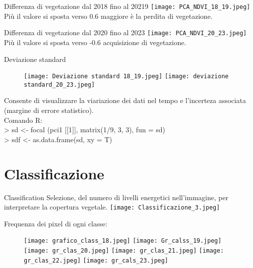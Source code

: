 \documentclass[10pt]{beamer}
\begin{document}
\begin{frame}
Differenza di vegetazione dal 2018 fino al 20219
\texttt{[image: PCA\_NDVI\_18\_19.jpeg]}
Più il valore si sposta verso 0.6 maggiore è la perdita di vegetazione.
\end{frame}
\begin{frame}
Differenza di vegetazione dal 2020 fino al 2023
\texttt{[image: PCA\_NDVI\_20\_23.jpeg]}
Più il valore si sposta verso -0.6 acquisizione di vegetazione.
\end{frame}   

\begin{frame}{Deviazione standard}
\begin{figure}
        \centering
        \texttt{[image: Deviazione standard 18\_19.jpeg]}
        \texttt{[image: deviazione standard\_20\_23.jpeg]} 
    \end{figure}
      Consente di visualizzare la viariazione dei dati nel tempo e l'incerteza associata (margine di errore statistico).\\
      Comando R: \\
      > sd <- focal (pci1 [[1]], matrix(1/9, 3, 3), fun = sd)\\
      > sdf <- as.data.frame(sd, xy = T)\\
\end{frame}

\section{Classificazione}
\begin{frame}{Classification}
Selezione, del numero di livelli energetici nell'immagine, per interpretare la copertura vegetale.
\texttt{[image: Classificazione\_3.jpeg]}
\end{frame}
\begin{frame}
Frequenza dei pixel di ogni classe:
\begin{figure}
        \centering
        \texttt{[image: grafico\_class\_18.jpeg]}
        \texttt{[image: Gr\_calss\_19.jpeg]} 
        \texttt{[image: gr\_clas\_20.jpeg]}
        \texttt{[image: gr\_clas\_21.jpeg]}
        \texttt{[image: gr\_clas\_22.jpeg]} 
        \texttt{[image: gr\_cals\_23.jpeg]}
    \end{figure}
\end{frame}
\end{document}
